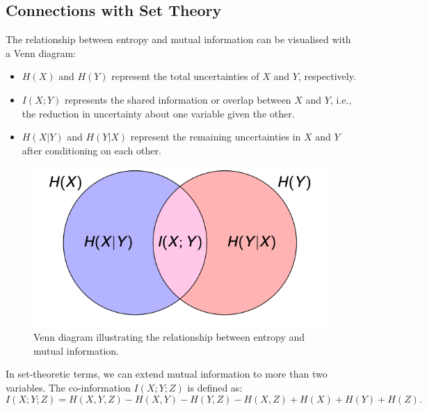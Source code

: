\subsection{Connections with Set Theory}


The relationship between entropy and mutual information can be visualised with a Venn diagram:
\begin{itemize}
    \item \( H(X) \) and \( H(Y) \) represent the total uncertainties of \( X \) and \( Y \), respectively.
    \item \( I(X; Y) \) represents the shared information or overlap between \( X \) and \( Y \), i.e., the reduction in uncertainty about one variable given the other.
    \item \( H(X | Y) \) and \( H(Y | X) \) represent the remaining uncertainties in \( X \) and \( Y \) after conditioning on each other.
\end{itemize}


\begin{figure}[h]
    \centering
    \includegraphics[width=0.6\linewidth]{img/hi_venn.png}
    \caption{Venn diagram illustrating the relationship between entropy and mutual information.}
\end{figure}






In set-theoretic terms, we can extend mutual information to more than two variables. The co-information \( I(X; Y; Z) \) is defined as:
\[
    I(X; Y; Z) = H(X, Y, Z) - H(X, Y) - H(Y, Z) - H(X, Z) + H(X) + H(Y) + H(Z).
\]

